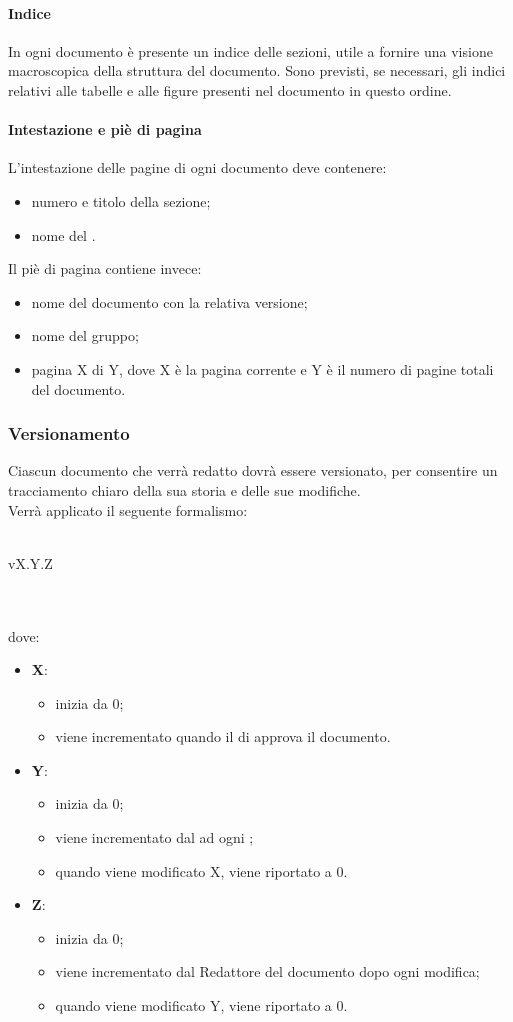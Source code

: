  \paragraph{Indice}
 In ogni documento è presente un indice delle sezioni, utile a fornire una visione macroscopica della struttura del documento. Sono previsti, se necessari, gli indici relativi alle tabelle e alle figure presenti nel documento in questo ordine.
 \paragraph{Intestazione e piè di pagina}
L'intestazione delle pagine di ogni documento deve contenere:
\begin{itemize}
	\item numero e titolo della sezione;
	\item nome del .
\end{itemize} 
Il piè di pagina contiene invece:
\begin{itemize}
	\item nome del documento con la relativa versione;
	\item nome del gruppo;
	\item pagina X di Y, dove X è la pagina corrente e Y è il numero di pagine totali del documento.
\end{itemize} 
\subsubsection{Versionamento}
Ciascun documento che verrà redatto dovrà essere versionato, per consentire un tracciamento chiaro della sua storia e delle sue modifiche.\\Verrà applicato il seguente formalismo:\\ \\ \centerline{vX.Y.Z}\\ \\dove:
\begin{itemize}
	\item \textbf{X}:
	\begin{itemize}
		\item inizia da 0;
		\item viene incrementato quando il \RESP{} di  approva il documento.
	\end{itemize}
	\item \textbf{Y}:
	\begin{itemize}
		\item inizia da 0;
		\item viene incrementato dal \VER{} ad ogni ;
		\item quando viene modificato X, viene riportato a 0.
	\end{itemize}
	\item \textbf{Z}:
	\begin{itemize}
		\item inizia da 0;
		\item viene incrementato dal Redattore del documento dopo ogni modifica;
		\item quando viene modificato Y, viene riportato a 0.
	\end{itemize}
\end{itemize}

